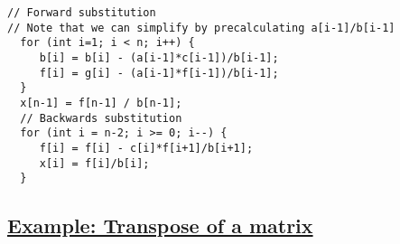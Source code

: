 \documentclass[%
oneside,                 %
final,                   %
10pt]{article}
\begin{document}
\begin{verbatim}
// Forward substitution    
// Note that we can simplify by precalculating a[i-1]/b[i-1]
  for (int i=1; i < n; i++) {
     b[i] = b[i] - (a[i-1]*c[i-1])/b[i-1];
     f[i] = g[i] - (a[i-1]*f[i-1])/b[i-1];
  }
  x[n-1] = f[n-1] / b[n-1];
  // Backwards substitution                                                           
  for (int i = n-2; i >= 0; i--) {
     f[i] = f[i] - c[i]*f[i+1]/b[i+1];
     x[i] = f[i]/b[i];
  }

\end{verbatim}



\subsection*{\href{{https://github.com/CompPhysics/ComputationalPhysicsMSU/blob/master/doc/Programs/LecturePrograms/programs/Classes/cpp/program8.cpp}}{Example: Transpose of a matrix}}
\end{document}
